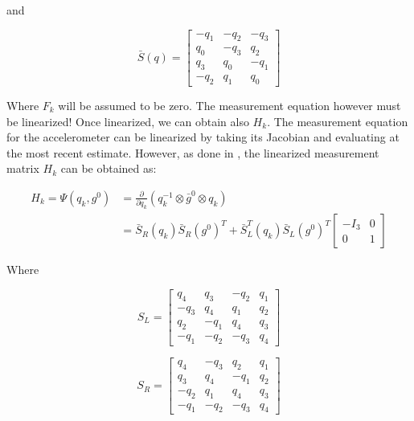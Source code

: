 \documentclass[a4paper,10pt]{article}
\begin{document}
\begin{itemize}
and 

\begin{equation}
 \bar{S}(q) = \left[
 \begin{matrix}
  -q_1 & -q_2 & -q_3 \\
   q_0 & -q_3 &  q_2 \\
   q_3 &  q_0 & -q_1 \\
  -q_2 &  q_1 &  q_0
 \end{matrix}\right]
\end{equation}

Where $F_k$ will be assumed to be zero. The measurement equation however must be linearized! Once linearized, we can obtain also $H_k$. The measurement equation for the accelerometer can be linearized by taking its Jacobian and evaluating at the most recent estimate. However, as done in \cite{Ligorio2013}, the linearized measurement matrix $H_k$ can be obtained as:

\begin{align}
 H_k = \Psi(q_k, g^0) &= \frac{\partial}{\partial q_k}  \left( q^{-1}_k \otimes \bar{g}^0 \otimes q_k \right)\\
                      &= \bar{S}_R(q_k) \bar{S}_R(g^0)^T + \bar{S}^T_L(q_k) \bar{S}_L(g^0)^T \left[\begin{matrix} -I_3 & 0 \\0  & 1 
			     \end{matrix}\right]
\end{align}

Where

\begin{equation}
 S_L = \left[\begin{matrix}
	       q_4 &  q_3 & -q_2 & q_1\\
	      -q_3 &  q_4 &  q_1 & q_2\\
	       q_2 & -q_1 &  q_4 & q_3\\
	      -q_1 & -q_2 & -q_3 & q_4
	     \end{matrix}\right]
\end{equation}

\begin{equation}
  S_R = \left[\begin{matrix}
	       q_4 & -q_3 &  q_2 & q_1\\
	       q_3 &  q_4 & -q_1 & q_2\\
	      -q_2 &  q_1 &  q_4 & q_3\\
	      -q_1 & -q_2 & -q_3 & q_4
	     \end{matrix}\right]
\end{equation}


\end{itemize}
\end{document}
